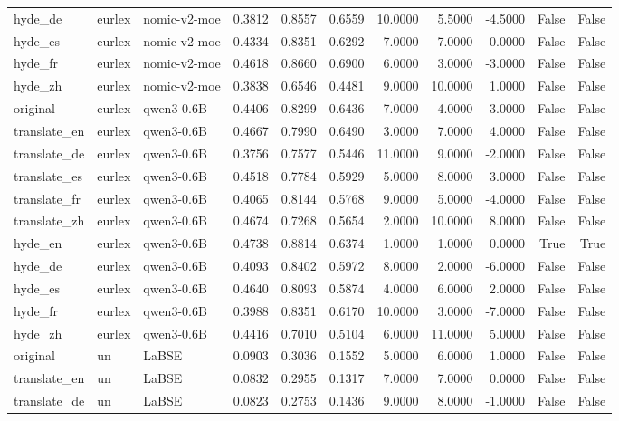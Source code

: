 \begin{tabular}{lllrrrrrrrr}
hyde\_de & eurlex & nomic-v2-moe & 0.3812 & 0.8557 & 0.6559 & 10.0000 & 5.5000 & -4.5000 & False & False \\
hyde\_es & eurlex & nomic-v2-moe & 0.4334 & 0.8351 & 0.6292 & 7.0000 & 7.0000 & 0.0000 & False & False \\
hyde\_fr & eurlex & nomic-v2-moe & 0.4618 & 0.8660 & 0.6900 & 6.0000 & 3.0000 & -3.0000 & False & False \\
hyde\_zh & eurlex & nomic-v2-moe & 0.3838 & 0.6546 & 0.4481 & 9.0000 & 10.0000 & 1.0000 & False & False \\
original & eurlex & qwen3-0.6B & 0.4406 & 0.8299 & 0.6436 & 7.0000 & 4.0000 & -3.0000 & False & False \\
translate\_en & eurlex & qwen3-0.6B & 0.4667 & 0.7990 & 0.6490 & 3.0000 & 7.0000 & 4.0000 & False & False \\
translate\_de & eurlex & qwen3-0.6B & 0.3756 & 0.7577 & 0.5446 & 11.0000 & 9.0000 & -2.0000 & False & False \\
translate\_es & eurlex & qwen3-0.6B & 0.4518 & 0.7784 & 0.5929 & 5.0000 & 8.0000 & 3.0000 & False & False \\
translate\_fr & eurlex & qwen3-0.6B & 0.4065 & 0.8144 & 0.5768 & 9.0000 & 5.0000 & -4.0000 & False & False \\
translate\_zh & eurlex & qwen3-0.6B & 0.4674 & 0.7268 & 0.5654 & 2.0000 & 10.0000 & 8.0000 & False & False \\
hyde\_en & eurlex & qwen3-0.6B & 0.4738 & 0.8814 & 0.6374 & 1.0000 & 1.0000 & 0.0000 & True & True \\
hyde\_de & eurlex & qwen3-0.6B & 0.4093 & 0.8402 & 0.5972 & 8.0000 & 2.0000 & -6.0000 & False & False \\
hyde\_es & eurlex & qwen3-0.6B & 0.4640 & 0.8093 & 0.5874 & 4.0000 & 6.0000 & 2.0000 & False & False \\
hyde\_fr & eurlex & qwen3-0.6B & 0.3988 & 0.8351 & 0.6170 & 10.0000 & 3.0000 & -7.0000 & False & False \\
hyde\_zh & eurlex & qwen3-0.6B & 0.4416 & 0.7010 & 0.5104 & 6.0000 & 11.0000 & 5.0000 & False & False \\
original & un & LaBSE & 0.0903 & 0.3036 & 0.1552 & 5.0000 & 6.0000 & 1.0000 & False & False \\
translate\_en & un & LaBSE & 0.0832 & 0.2955 & 0.1317 & 7.0000 & 7.0000 & 0.0000 & False & False \\
translate\_de & un & LaBSE & 0.0823 & 0.2753 & 0.1436 & 9.0000 & 8.0000 & -1.0000 & False & False \\

\end{tabular}
